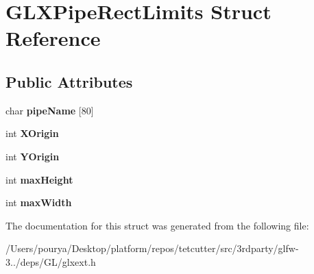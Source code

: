 \hypertarget{structGLXPipeRectLimits}{}\section{G\+L\+X\+Pipe\+Rect\+Limits Struct Reference}
\label{structGLXPipeRectLimits}
\subsection*{Public Attributes}
\begin{DoxyCompactItemize}
\item 
\hypertarget{structGLXPipeRectLimits_a8185d6cb288eef8cbacb9eb9f3c50d79}{}char {\bfseries pipe\+Name} \mbox{[}80\mbox{]}\label{structGLXPipeRectLimits_a8185d6cb288eef8cbacb9eb9f3c50d79}

\item 
\hypertarget{structGLXPipeRectLimits_a3e5a965059d9f5d2ca42acd35af5bb9b}{}int {\bfseries X\+Origin}\label{structGLXPipeRectLimits_a3e5a965059d9f5d2ca42acd35af5bb9b}

\item 
\hypertarget{structGLXPipeRectLimits_a50e06bcf0dae95854be7d93a515199e9}{}int {\bfseries Y\+Origin}\label{structGLXPipeRectLimits_a50e06bcf0dae95854be7d93a515199e9}

\item 
\hypertarget{structGLXPipeRectLimits_a27572e499c0d3280031c2ad8e387c0c1}{}int {\bfseries max\+Height}\label{structGLXPipeRectLimits_a27572e499c0d3280031c2ad8e387c0c1}

\item 
\hypertarget{structGLXPipeRectLimits_a8662c7a712b30620e25fc994adf337a1}{}int {\bfseries max\+Width}\label{structGLXPipeRectLimits_a8662c7a712b30620e25fc994adf337a1}

\end{DoxyCompactItemize}


The documentation for this struct was generated from the following file\+:\begin{DoxyCompactItemize}
\item 
/\+Users/pourya/\+Desktop/platform/repos/tetcutter/src/3rdparty/glfw-\/3../deps/\+G\+L/glxext.\+h\end{DoxyCompactItemize}
